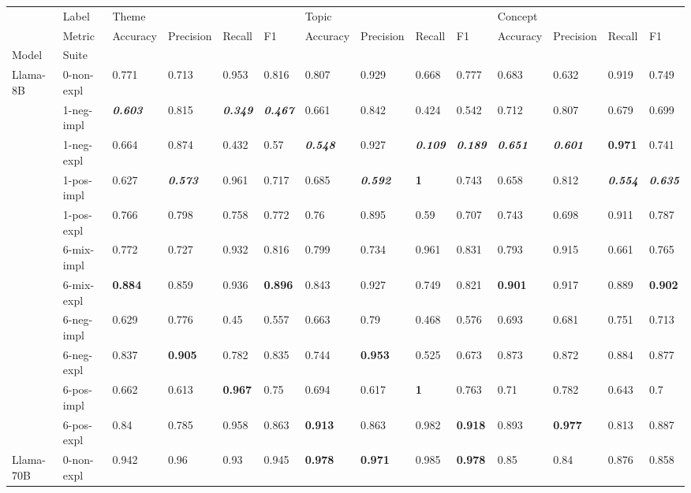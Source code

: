 \begin{tabular}{ll|llll|llll|llll}
\toprule
 & Label & \multicolumn{4}{l}{Theme} & \multicolumn{4}{l}{Topic} & \multicolumn{4}{l}{Concept} \\
 & Metric & Accuracy & Precision & Recall & F1 & Accuracy & Precision & Recall & F1 & Accuracy & Precision & Recall & F1 \\
Model & Suite &  &  &  &  &  &  &  &  &  &  &  &  \\
\midrule
\multirow[t]{11}{*}{Llama-8B} & 0-non-expl & 0.771 & 0.713 & 0.953 & 0.816 & 0.807 & 0.929 & 0.668 & 0.777 & 0.683 & 0.632 & 0.919 & 0.749 \\
 & 1-neg-impl & \bfseries \itshape 0.603 & 0.815 & \bfseries \itshape 0.349 & \bfseries \itshape 0.467 & 0.661 & 0.842 & 0.424 & 0.542 & 0.712 & 0.807 & 0.679 & 0.699 \\
 & 1-neg-expl & 0.664 & 0.874 & 0.432 & 0.57 & \bfseries \itshape 0.548 & 0.927 & \bfseries \itshape 0.109 & \bfseries \itshape 0.189 & \bfseries \itshape 0.651 & \bfseries \itshape 0.601 & \bfseries 0.971 & 0.741 \\
 & 1-pos-impl & 0.627 & \bfseries \itshape 0.573 & 0.961 & 0.717 & 0.685 & \bfseries \itshape 0.592 & \bfseries 1 & 0.743 & 0.658 & 0.812 & \bfseries \itshape 0.554 & \bfseries \itshape 0.635 \\
 & 1-pos-expl & 0.766 & 0.798 & 0.758 & 0.772 & 0.76 & 0.895 & 0.59 & 0.707 & 0.743 & 0.698 & 0.911 & 0.787 \\
 & 6-mix-impl & 0.772 & 0.727 & 0.932 & 0.816 & 0.799 & 0.734 & 0.961 & 0.831 & 0.793 & 0.915 & 0.661 & 0.765 \\
 & 6-mix-expl & \bfseries 0.884 & 0.859 & 0.936 & \bfseries 0.896 & 0.843 & 0.927 & 0.749 & 0.821 & \bfseries 0.901 & 0.917 & 0.889 & \bfseries 0.902 \\
 & 6-neg-impl & 0.629 & 0.776 & 0.45 & 0.557 & 0.663 & 0.79 & 0.468 & 0.576 & 0.693 & 0.681 & 0.751 & 0.713 \\
 & 6-neg-expl & 0.837 & \bfseries 0.905 & 0.782 & 0.835 & 0.744 & \bfseries 0.953 & 0.525 & 0.673 & 0.873 & 0.872 & 0.884 & 0.877 \\
 & 6-pos-impl & 0.662 & 0.613 & \bfseries 0.967 & 0.75 & 0.694 & 0.617 & \bfseries 1 & 0.763 & 0.71 & 0.782 & 0.643 & 0.7 \\
 & 6-pos-expl & 0.84 & 0.785 & 0.958 & 0.863 & \bfseries 0.913 & 0.863 & 0.982 & \bfseries 0.918 & 0.893 & \bfseries 0.977 & 0.813 & 0.887 \\
\midrule
\multirow[t]{11}{*}{Llama-70B} & 0-non-expl & 0.942 & 0.96 & 0.93 & 0.945 & \bfseries 0.978 & \bfseries 0.971 & 0.985 & \bfseries 0.978 & 0.85 & 0.84 & 0.876 & 0.858 \\

\end{tabular}
